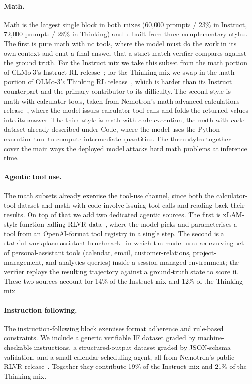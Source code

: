 \documentclass[11pt,a4paper]{article}
\begin{document}
\paragraph{Math.}
Math is the largest single block in both mixes (60{,}000 prompts / 23\% in
Instruct, 72{,}000 prompts / 28\% in Thinking) and is built from three
complementary styles. The first is pure math with no tools, where the
model must do the work in its own context and emit a final answer that
a strict-match verifier compares against the ground truth. For the
Instruct mix we take this subset from the math portion of OLMo-3's
Instruct RL release~\cite{olmo3}; for the Thinking mix we swap in the
math portion of OLMo-3's Thinking RL release~\cite{olmo3}, which is
harder than its Instruct counterpart and the primary contributor to its difficulty. 
The second style is math with calculator
tools, taken from Nemotron's math-advanced-calculations
release~\cite{nemo-gym}, where the model issues calculator-tool calls
and folds the returned values into its answer. The third style is math with code execution, the
math-with-code dataset already described under Code, where the model
uses the Python execution tool to compute intermediate quantities. The
three styles together cover the main ways the deployed model attacks
hard math problems at inference time.

\paragraph{Agentic tool use.}
The math subsets already exercise the tool-use channel, since both the
calculator-tool dataset and math-with-code involve issuing tool calls
and reading back their results. On top of that we add two dedicated
agentic sources. The first is xLAM-style function-calling RLVR
data~\cite{nemo-gym}, where the model picks and parameterises a tool
from an OpenAI-format tool registry in a single step. The second is a
stateful workplace-assistant benchmark~\cite{nemo-gym} in which the
model uses an evolving set of personal-assistant tools (calendar,
email, customer-relations, project-management, and analytics queries)
inside a session-managed environment; the verifier replays the resulting trajectory against a
ground-truth state to score it. These two sources account for 14\% of
the Instruct mix and 12\% of the Thinking mix.

\paragraph{Instruction following.}
The instruction-following block exercises format adherence and
rule-based constraints. We include a generic verifiable IF dataset
graded by machine-checkable instructions, a structured-output dataset
graded by JSON-schema validation, and a small calendar-scheduling
agent, all from Nemotron's public RLVR
release~\cite{nemo-gym}. Together they contribute 19\% of the Instruct
mix and 21\% of the Thinking mix.
\end{document}
